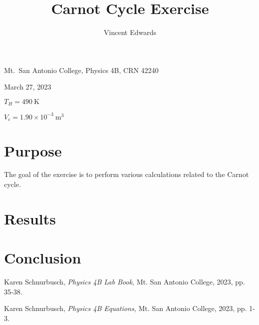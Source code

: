 \documentclass[12pt]{iopart} %
\begin{document}
\title{Carnot Cycle Exercise}
\author{Vincent Edwards}
\vspace{10pt}
\begin{indented}
  \item[]Mt.~San Antonio College, Physics 4B, CRN 42240
  \item[]March 27, 2023
  \item[]
  \item[]$T_H = 490~\mathrm{K}$
  \item[]$V_c = 1.90 \times 10^{-3}~\mathrm{m^3}$
\end{indented}
\newpage

\section{Purpose}

The goal of the exercise is to perform various calculations related to the Carnot cycle.

\section{Results}

\section{Conclusion}

\begin{thebibliography}{9}

  Karen Schnurbusch,
  \textit{Physics 4B Lab Book},
  Mt. San Antonio College,
  2023,
  pp. 35-38.

  Karen Schnurbusch,
  \textit{Physics 4B Equations},
  Mt. San Antonio College,
  2023,
  pp. 1-3.

\end{thebibliography}
\end{document}
